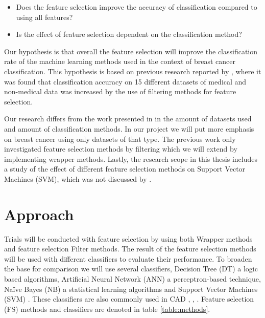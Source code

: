 \begin{itemize}
  \item Does the feature selection improve the accuracy of classification compared to using all features?
  \item Is the effect of feature selection dependent on the classification method?
\end{itemize}

Our hypothesis is that overall the feature selection will improve the classification rate of the machine learning methods used in the context of breast cancer classification. This hypothesis is based on previous research reported by \textcite{karabulut2012}, where it was found that classification accuracy on 15 different datasets of medical and non-medical data was increased by the use of filtering methods for feature selection.

Our research differs from the work presented in \parencite{karabulut2012} in the amount of datasets used and amount of classification methods. In our project we will put more emphasis on breast cancer using only datasets of that type. The previous work only investigated feature selection methods by filtering which we will extend by implementing wrapper methods. Lastly, the research scope in this thesis includes a study of the effect of different feature selection methods on Support Vector Machines (SVM), which was not discussed by \parencite{karabulut2012}.


\section{Approach}

Trials will be conducted with feature selection by using both Wrapper methods and feature selection Filter methods. The result of the feature selection methods will be used with different classifiers to evaluate their performance. To broaden the base for comparison we will use several classifiers, Decision Tree (DT) a logic based algorithms, Artificial Neural Network (ANN) a perceptron-based technique, Naïve Bayes (NB) a statistical learning algorithms and Support Vector Machines (SVM) \parencite{wallace2007}. These classifiers are also commonly used in CAD \parencite{ramos2012}, \parencite{akay2009}, \parencite{li2007}. Feature selection (FS) methods and classifiers are denoted in table \ref{table:methods}.

